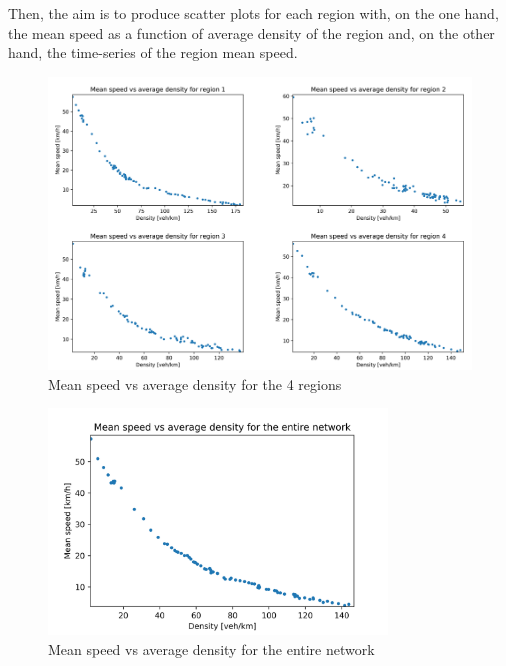 \documentclass[a4paper, 12pt,oneside]{article}
\begin{document}
Then, the aim is to produce scatter plots for each region with, on the one hand, the mean speed as a function of average density of the region and, on the other hand, the time-series of the region mean speed.

\bigbreak
\begin{figure}[H]
    \begin{center}
        \includegraphics[width=18cm]{Images/Mean speed vs average density for the 4 regions.png}
        \caption{Mean speed vs average density for the 4 regions}
        \label{Mean speed vs average density for the 4 regions}
    \end{center}
\end{figure}

\begin{figure}[H]
    \begin{center}
        \includegraphics[width=9cm]{Images/Mean speed vs average density for the entire network.png}
        \caption{Mean speed vs average density for the entire network}
        \label{Mean speed vs average density for the entire network}
    \end{center}
\end{figure}
\end{document}
